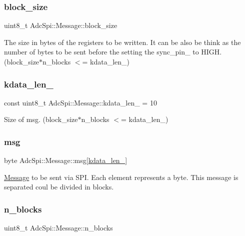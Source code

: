 \subsubsection{\texorpdfstring{block\+\_\+size}{block\_size}}
{\footnotesize\ttfamily uint8\+\_\+t Adc\+Spi\+::\+Message\+::block\+\_\+size}

The size in bytes of the registers to be written. It can be also be think as the number of bytes to be sent before the setting the sync\+\_\+pin\+\_\+ to H\+I\+GH. (block\+\_\+size$\ast$n\+\_\+blocks $<$= kdata\+\_\+len\+\_\+) \mbox{\label{structAdcSpi_1_1Message_adf1b26b00ddb16b65de390919c8d2270}} 
\subsubsection{\texorpdfstring{kdata\+\_\+len\+\_\+}{kdata\_len\_}}
{\footnotesize\ttfamily const uint8\+\_\+t Adc\+Spi\+::\+Message\+::kdata\+\_\+len\+\_\+ = 10\hspace{0.3cm}{\ttfamily [static]}}

Size of msg. (block\+\_\+size$\ast$n\+\_\+blocks $<$= kdata\+\_\+len\+\_\+) \mbox{\label{structAdcSpi_1_1Message_a958a98a8a79743532b8bdf1cfe339eb2}} 
\subsubsection{\texorpdfstring{msg}{msg}}
{\footnotesize\ttfamily byte Adc\+Spi\+::\+Message\+::msg\mbox{[}\mbox{\hyperlink{structAdcSpi_1_1Message_adf1b26b00ddb16b65de390919c8d2270}{kdata\+\_\+len\+\_\+}}\mbox{]}}

\mbox{\hyperlink{structAdcSpi_1_1Message}{Message}} to be sent via S\+PI. Each element represents a byte. This message is separated coul be divided in blocks. \mbox{\label{structAdcSpi_1_1Message_a7f1b15e4a568314fee4210faaed79a62}} 
\subsubsection{\texorpdfstring{n\+\_\+blocks}{n\_blocks}}
{\footnotesize\ttfamily uint8\+\_\+t Adc\+Spi\+::\+Message\+::n\+\_\+blocks}

